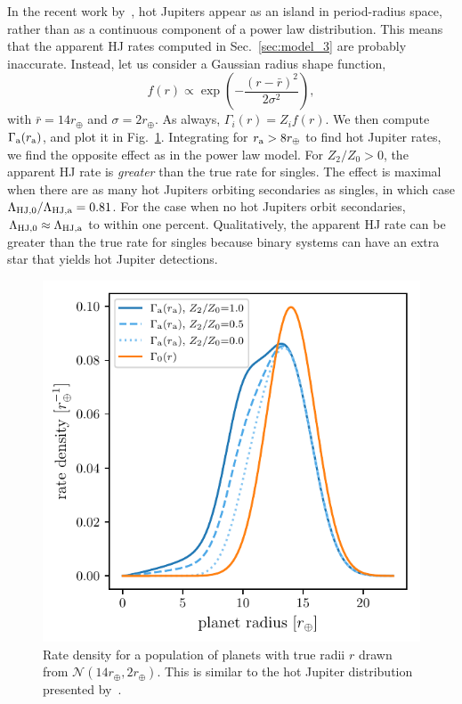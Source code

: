 \documentclass[12pt,modern]{aastex61}
\renewcommand{\a}{_{\rm a}}
\begin{document}
In the recent work by~\citet{petigura_CKS_2017}, hot Jupiters appear as an 
island in period-radius space, rather than as a continuous component of a 
power law distribution.
This means that the apparent HJ rates computed in 
Sec.~\ref{sec:model_3} are probably inaccurate.
Instead, let us consider a Gaussian radius shape function,
\begin{equation}
f(r) \propto \exp \left( -\frac{(r-\bar{r})^2}{2\sigma^2} \right),
\end{equation}
with $\bar{r} = 14r_\oplus$ and $\sigma = 2r_\oplus$.
As always, $\Gamma_i(r) = Z_i f(r)$.
We then compute $\Gamma\a(r\a)$, and plot it in Fig.~\ref{fig:gaussian_HJ}.
Integrating for $r\a > 8r_\oplus$ to find hot Jupiter rates,
we find the opposite effect as in the power law model.
For $Z_2/Z_0>0$, 
the apparent HJ rate is {\it greater} than the true rate for singles.
The effect is maximal when there are as many hot Jupiters orbiting secondaries 
as singles, in which case
$\Lambda_{{\rm HJ},0}/\Lambda_{\rm HJ,a} = 0.81$.
For the case when no hot Jupiters orbit secondaries, $\Lambda_{{\rm HJ},0} 
\approx \Lambda_{\rm HJ,a}$ to within one percent.
Qualitatively, the apparent HJ rate can be greater than the true rate for 
singles because binary systems can have an extra star that yields 
hot Jupiter detections.


\begin{figure}[!tb]
    \centering
    \includegraphics[width=.6\textwidth]{figures/int_rate_density_vs_radius_model_7_rpu_22.5_manyZs.pdf}
    \caption{
        Rate density for a population of planets with true radii $r$ drawn from
        $\mathcal{N}(14r_\oplus,2r_\oplus)$.
        This is similar to the hot Jupiter distribution presented 
        by~\citet{petigura_CKS_2017}.
    }
    \label{fig:gaussian_HJ}
\end{figure}
\end{document}
